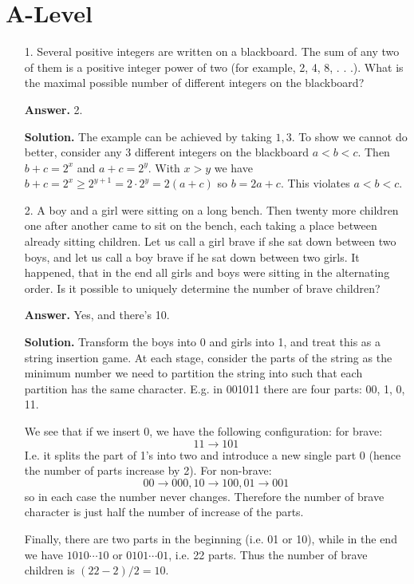 \documentclass[11pt,a4paper]{article}
\begin{document}
\section*{A-Level}
\begin{enumerate}
	\item[1.] 
	Several positive integers are written on a blackboard. The sum of any two of them is a
	positive integer power of two (for example, 2, 4, 8, . . .). What is the maximal possible number of
	different integers on the blackboard?
	
	\textbf{Answer.} 2. 
	
	\textbf{Solution.} The example can be achieved by taking $1, 3$. 
	To show we cannot do better, consider any 3 different integers on the blackboard $a<b<c$. 
	Then $b+c=2^x$ and $a+c=2^y$. 
	With $x>y$ we have $b+c=2^x\ge 2^{y+1}=2\cdot 2^y=2(a+c)$
	so $b=2a+c$. This violates $a<b<c$. 
	
	\item[2.] 
	A boy and a girl were sitting on a long bench. 
	Then twenty more children one after another came to sit on the bench, 
	each taking a place between already sitting children. Let us call a girl brave if she sat down between two boys, and let us call a boy brave if he sat down between two girls. 
	It happened, that in the end all girls and boys were sitting in the alternating order. 
	Is it possible to uniquely determine the number of brave children?
	
	\textbf{Answer.} Yes, and there's 10. 
	
	\textbf{Solution.} 
	Transform the boys into 0 and girls into 1, 
	and treat this as a string insertion game. 
	At each stage, consider the parts of the string as the minimum number we need to partition the string into such that each partition has the same character. 
	E.g. in 001011 there are four parts: 00, 1, 0, 11. 
	
	We see that if we insert 0, we have the following configuration: for brave: 
	\[
	11\to 101
	\]
	I.e. it splits the part of 1's into two and introduce a new single part 0 (hence the number of parts increase by 2). 
	For non-brave:
	\[
	00\to 000, 10\to 100, 01\to 001
	\]
	so in each case the number never changes. 
	Therefore the number of brave character is just half the number of increase of the parts. 
	
	Finally, there are two parts in the beginning (i.e. 01 or 10), 
	while in the end we have $1010\cdots 10$ or $0101\cdots 01$, i.e. 22 parts. 
	Thus the number of brave children is $(22-2)/2=10$. 
	
\end{enumerate}
\end{document}
